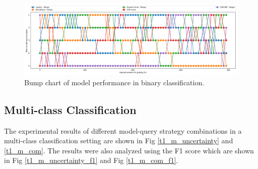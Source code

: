 	\begin{figure}[!htb]
		\centering
		\includegraphics[scale=0.3]{images/binary/task1_rank}
		\caption{Bump chart of model performance in binary classification.}
		\label{t1_b_bump}
	\end{figure}
	
	
	
%	
	
	
	
	\clearpage
	\subsection{Multi-class Classification}

	The experimental results of different model-query strategy combinations in a multi-class classification setting are shown in Fig \ref{t1_m_uncertainty} and \ref{t1_m_com}. The results were also analyzed using the F1 score which are shown in Fig \ref{t1_m_uncertainty_f1} and Fig \ref{t1_m_com_f1}.
	

